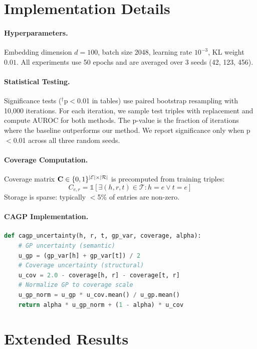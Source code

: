\section{Implementation Details}
\label{app:implementation}

\paragraph{Hyperparameters.}
Embedding dimension $d=100$, batch size 2048, learning rate $10^{-3}$, KL weight $0.01$.
All experiments use 50 epochs and are averaged over 3 seeds (42, 123, 456).

\paragraph{Statistical Testing.}
Significance tests ($^\dagger$p$<$0.01 in tables) use paired bootstrap resampling with 10,000 iterations.
For each iteration, we sample test triples with replacement and compute AUROC for both methods.
The p-value is the fraction of iterations where the baseline outperforms our method.
We report significance only when p$<$0.01 across all three random seeds.

\paragraph{Coverage Computation.}
Coverage matrix $\mathbf{C} \in \{0,1\}^{|\mathcal{E}| \times |\mathcal{R}|}$ is precomputed from training triples:
\begin{equation}
    C_{e,r} = \mathbb{1}[\exists (h,r,t) \in \mathcal{T} : h=e \lor t=e]
\end{equation}
Storage is sparse: typically $<$5\% of entries are non-zero.

\paragraph{CAGP Implementation.}
\begin{lstlisting}[language=Python]
def cagp_uncertainty(h, r, t, gp_var, coverage, alpha):
    # GP uncertainty (semantic)
    u_gp = (gp_var[h] + gp_var[t]) / 2
    # Coverage uncertainty (structural)
    u_cov = 2.0 - coverage[h, r] - coverage[t, r]
    # Normalize GP to coverage scale
    u_gp_norm = u_gp * u_cov.mean() / u_gp.mean()
    return alpha * u_gp_norm + (1 - alpha) * u_cov
\end{lstlisting}

\section{Extended Results}
\label{app:extended}


